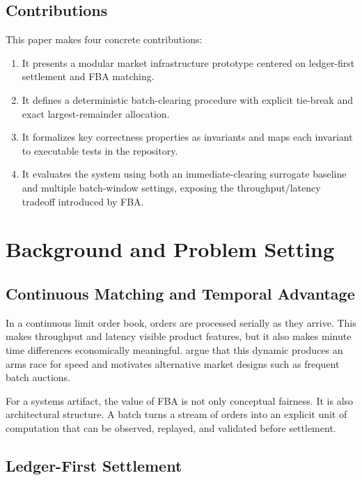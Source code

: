 \documentclass[11pt]{article}
\begin{document}
\subsection{Contributions}

This paper makes four concrete contributions:

\begin{enumerate}[leftmargin=1.5em]
  \item It presents a modular market infrastructure prototype centered on ledger-first settlement and FBA matching.
  \item It defines a deterministic batch-clearing procedure with explicit tie-break and exact largest-remainder allocation.
  \item It formalizes key correctness properties as invariants and maps each invariant to executable tests in the repository.
  \item It evaluates the system using both an immediate-clearing surrogate baseline and multiple batch-window settings, exposing the throughput/latency tradeoff introduced by FBA.
\end{enumerate}

\section{Background and Problem Setting}

\subsection{Continuous Matching and Temporal Advantage}

In a continuous limit order book, orders are processed serially as they arrive. This makes throughput and latency visible product features, but it also makes minute time differences economically meaningful. \citet{budish2015hft} argue that this dynamic produces an arms race for speed and motivates alternative market designs such as frequent batch auctions.

For a systems artifact, the value of FBA is not only conceptual fairness. It is also architectural structure. A batch turns a stream of orders into an explicit unit of computation that can be observed, replayed, and validated before settlement.

\subsection{Ledger-First Settlement}
\end{document}
